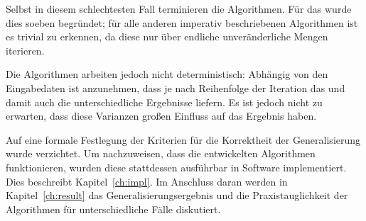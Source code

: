 \documentclass[../main/thesis.tex]{subfiles}
\begin{document}
Selbst in diesem schlechtesten Fall terminieren die Algorithmen.
Für das  wurde dies soeben begründet; für alle anderen imperativ beschriebenen Algorithmen ist es trivial zu erkennen, da diese nur über endliche unveränderliche Mengen iterieren.

Die Algorithmen arbeiten jedoch nicht deterministisch:
Abhängig von den Eingabedaten ist anzunehmen, dass je nach Reihenfolge der Iteration das  und damit auch die  unterschiedliche Ergebnisse liefern.
Es ist jedoch nicht zu erwarten, dass diese Varianzen großen Einfluss auf das Ergebnis haben.

Auf eine formale Festlegung der Kriterien für die Korrektheit der Generalisierung wurde verzichtet.
Um nachzuweisen, dass die entwickelten Algorithmen funktionieren, wurden diese stattdessen ausführbar in Software implementiert.
Dies beschreibt Kapitel~\ref{ch:impl}.
Im Anschluss daran werden in Kapitel~\ref{ch:result} das Generalisierungsergebnis und die Praxistauglichkeit der Algorithmen für unterschiedliche Fälle diskutiert.



\end{document}
